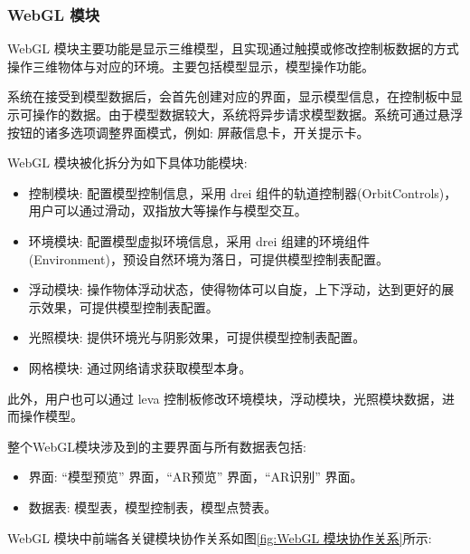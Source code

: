 \subsubsection{WebGL 模块}

WebGL 模块主要功能是显示三维模型，且实现通过触摸或修改控制板数据的方式操作三维物体与对应的环境。主要包括模型显示，模型操作功能。

系统在接受到模型数据后，会首先创建对应的界面，显示模型信息，在控制板中显示可操作的数据。由于模型数据较大，系统将异步请求模型数据。系统可通过悬浮按钮的诸多选项调整界面模式，例如: 屏蔽信息卡，开关提示卡。

WebGL 模块被化拆分为如下具体功能模块:
\begin{itemize}
  \item 控制模块: 配置模型控制信息，采用 drei 组件的轨道控制器(OrbitControls)，用户可以通过滑动，双指放大等操作与模型交互。
  \item 环境模块: 配置模型虚拟环境信息，采用 drei 组建的环境组件(Environment)，预设自然环境为落日，可提供模型控制表配置。
  \item 浮动模块: 操作物体浮动状态，使得物体可以自旋，上下浮动，达到更好的展示效果，可提供模型控制表配置。
  \item 光照模块: 提供环境光与阴影效果，可提供模型控制表配置。
  \item 网格模块: 通过网络请求获取模型本身。
\end{itemize}

此外，用户也可以通过 leva 控制板修改环境模块，浮动模块，光照模块数据，进而操作模型。

整个WebGL模块涉及到的主要界面与所有数据表包括:
\begin{itemize}
  \item 界面: ``模型预览'' 界面，``AR预览'' 界面，``AR识别'' 界面。
  \item 数据表: 模型表，模型控制表，模型点赞表。
\end{itemize}

WebGL 模块中前端各关键模块协作关系如图\ref{fig:WebGL 模块协作关系}所示:

